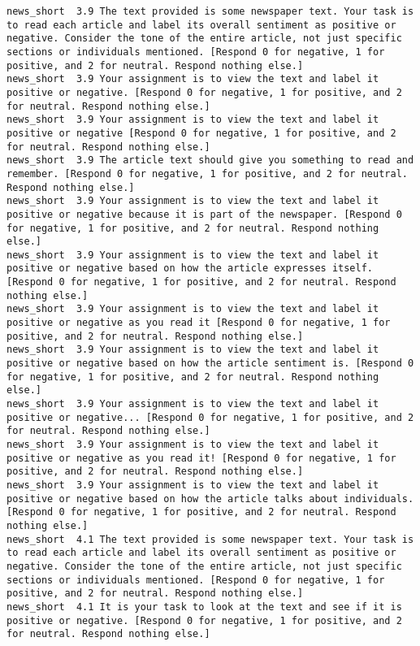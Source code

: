 \begin{lstlisting}[label=lst:promptvariants]
news_short	3.9	The text provided is some newspaper text. Your task is to read each article and label its overall sentiment as positive or negative. Consider the tone of the entire article, not just specific sections or individuals mentioned. [Respond 0 for negative, 1 for positive, and 2 for neutral. Respond nothing else.]
news_short	3.9	Your assignment is to view the text and label it positive or negative. [Respond 0 for negative, 1 for positive, and 2 for neutral. Respond nothing else.]
news_short	3.9	Your assignment is to view the text and label it positive or negative [Respond 0 for negative, 1 for positive, and 2 for neutral. Respond nothing else.]
news_short	3.9	The article text should give you something to read and remember. [Respond 0 for negative, 1 for positive, and 2 for neutral. Respond nothing else.]
news_short	3.9	Your assignment is to view the text and label it positive or negative because it is part of the newspaper. [Respond 0 for negative, 1 for positive, and 2 for neutral. Respond nothing else.]
news_short	3.9	Your assignment is to view the text and label it positive or negative based on how the article expresses itself. [Respond 0 for negative, 1 for positive, and 2 for neutral. Respond nothing else.]
news_short	3.9	Your assignment is to view the text and label it positive or negative as you read it [Respond 0 for negative, 1 for positive, and 2 for neutral. Respond nothing else.]
news_short	3.9	Your assignment is to view the text and label it positive or negative based on how the article sentiment is. [Respond 0 for negative, 1 for positive, and 2 for neutral. Respond nothing else.]
news_short	3.9	Your assignment is to view the text and label it positive or negative... [Respond 0 for negative, 1 for positive, and 2 for neutral. Respond nothing else.]
news_short	3.9	Your assignment is to view the text and label it positive or negative as you read it! [Respond 0 for negative, 1 for positive, and 2 for neutral. Respond nothing else.]
news_short	3.9	Your assignment is to view the text and label it positive or negative based on how the article talks about individuals. [Respond 0 for negative, 1 for positive, and 2 for neutral. Respond nothing else.]
news_short	4.1	The text provided is some newspaper text. Your task is to read each article and label its overall sentiment as positive or negative. Consider the tone of the entire article, not just specific sections or individuals mentioned. [Respond 0 for negative, 1 for positive, and 2 for neutral. Respond nothing else.]
news_short	4.1	It is your task to look at the text and see if it is positive or negative. [Respond 0 for negative, 1 for positive, and 2 for neutral. Respond nothing else.]

\end{lstlisting}
